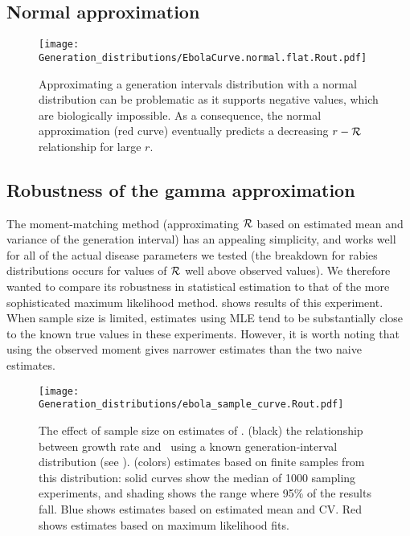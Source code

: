 

\subsection{Normal approximation}


\begin{figure}[htbp] \centering
	\texttt{[image: Generation\_distributions/EbolaCurve.normal.flat.Rout.pdf]}
\caption{
Approximating a generation intervals distribution with a normal distribution can be problematic as it supports negative values, which are biologically impossible. As a consequence, the normal approximation (red curve) eventually predicts a decreasing $r-{\cal R}$ relationship for large $r$.
}
	\label{fig:ebolaNormal}
\end{figure}

\subsection{Robustness of the gamma approximation}

The moment-matching method (approximating ${\cal R}$ based on estimated mean and variance of the generation interval) has an appealing simplicity, and works well for all of the actual disease parameters we tested (the breakdown for rabies distributions occurs for values of ${\cal R}$ well above observed values). We therefore wanted to compare its robustness in statistical estimation to that of the more sophisticated maximum likelihood method.  shows results of this experiment. When sample size is limited, estimates using MLE tend to be substantially close to the known true values in these experiments. However, it is worth noting that using the observed moment gives narrower estimates than the two naive estimates.

\begin{figure}[htbp] \centering
	\texttt{[image: Generation\_distributions/ebola\_sample\_curve.Rout.pdf]}
\caption{
%
The effect of sample size on estimates of \RR.
(black) the relationship between growth rate and \RR~using a known generation-interval distribution (see ).
(colors) estimates based on finite samples from this distribution: solid curves show the median of 1000 sampling experiments, and shading shows the range where 95\% of the results fall.
Blue shows estimates based on estimated mean and CV.
Red shows estimates based on maximum likelihood fits.
%
}
	\label{fig:ebolaSample}
\end{figure}

